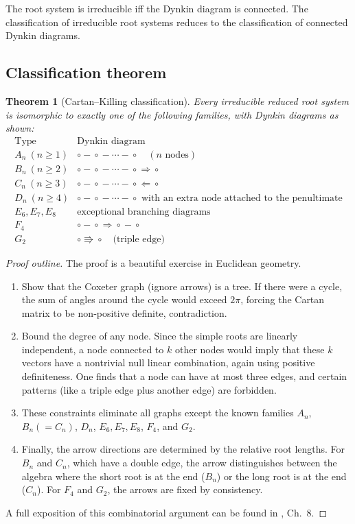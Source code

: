 \documentclass{article}
\newtheorem{theorem}{Theorem}[section]
\theoremstyle{definition}
\theoremstyle{remark}
\begin{document}
The root system is irreducible iff the Dynkin diagram is connected. The classification
of irreducible root systems reduces to the classification of connected Dynkin diagrams.

\subsection{Classification theorem}
\begin{theorem}[Cartan–Killing classification]
Every irreducible reduced root system is isomorphic to exactly one of the following
families, with Dynkin diagrams as shown:
\[
\begin{array}{c|l}
\text{Type} & \text{Dynkin diagram} \\ \hline
A_n\ (n\ge1) & \circ\!-\!\circ\!-\!\cdots\!-\!\circ \quad (n\text{ nodes}) \\
B_n\ (n\ge2) & \circ\!-\!\circ\!-\!\cdots\!-\!\circ\!\Rightarrow\!\circ \\
C_n\ (n\ge3) & \circ\!-\!\circ\!-\!\cdots\!-\!\circ\!\Leftarrow\!\circ \\
D_n\ (n\ge4) & \circ\!-\!\circ\!-\!\cdots\!-\!\circ\text{ with an extra node attached to the penultimate} \\
E_6, E_7, E_8 & \text{exceptional branching diagrams} \\
F_4 & \circ\!-\!\circ\!\Rightarrow\!\circ\!-\!\circ \\
G_2 & \circ\!\Rrightarrow\!\circ \quad\text{(triple edge)}
\end{array}
\]
\end{theorem}
\begin{proof}[Proof outline]
The proof is a beautiful exercise in Euclidean geometry.
\begin{enumerate}
  \item Show that the Coxeter graph (ignore arrows) is a tree. If there were a cycle,
    the sum of angles around the cycle would exceed $2\pi$, forcing the Cartan matrix
    to be non‑positive definite, contradiction.
  \item Bound the degree of any node. Since the simple roots are linearly independent,
    a node connected to $k$ other nodes would imply that these $k$ vectors have a
    nontrivial null linear combination, again using positive definiteness. One finds
    that a node can have at most three edges, and certain patterns (like a triple
    edge plus another edge) are forbidden.
  \item These constraints eliminate all graphs except the known families $A_n$,
    $B_n (=C_n)$, $D_n$, $E_6, E_7, E_8$, $F_4$, and $G_2$.
  \item Finally, the arrow directions are determined by the relative root lengths.
    For $B_n$ and $C_n$, which have a double edge, the arrow distinguishes between
    the algebra where the short root is at the end ($B_n$) or the long root is at the
    end ($C_n$). For $F_4$ and $G_2$, the arrows are fixed by consistency.
\end{enumerate}
A full exposition of this combinatorial argument can be found in \cite{Hall}, Ch.~8.
\end{proof}
\end{document}
